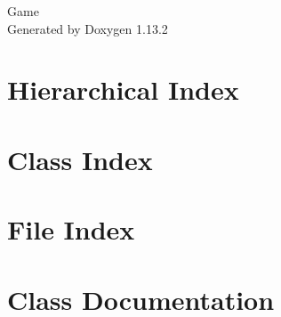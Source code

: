 \documentclass[twoside]{book}
\newcommand{\+}{\discretionary{\mbox{\scriptsize$\hookleftarrow$}}{}{}}
\newcommand{\clearemptydoublepage}{%
    \newpage{\pagestyle{empty}\cleardoublepage}%
  }
\begin{document}
  \raggedbottom
    \hypersetup{pageanchor=false,
                bookmarksnumbered=true,
                pdfencoding=unicode
               }
  \begin{titlepage}
  \vspace*{7cm}
  \begin{center}%
  {\Large Game}\\
  \vspace*{1cm}
  {\large Generated by Doxygen 1.13.2}\\
  \end{center}
  \end{titlepage}
  \clearemptydoublepage
  \tableofcontents
  \clearemptydoublepage
  \hypersetup{pageanchor=true}
\chapter{Hierarchical Index}

\chapter{Class Index}

\chapter{File Index}

\chapter{Class Documentation}




















































\end{document}
